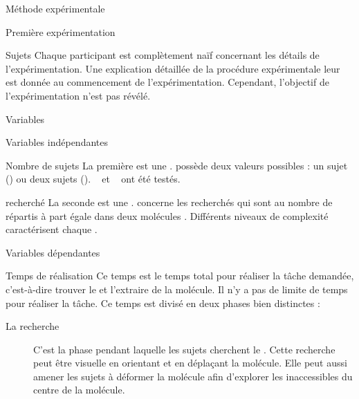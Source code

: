 \documentclass[myfrancais,ngerman,english,frenchb]{mythesis}
\begin{document}
\begin{mychapter}{Méthode expérimentale}
\begin{mysection}{Première expérimentation}
\begin{mysubsection}{Sujets}
				Chaque participant est complètement naïf concernant les détails de l'expérimentation.
				Une explication détaillée de la procédure expérimentale leur est donnée au commencement de l'expérimentation.
				Cependant, l'objectif de l'expérimentation n'est pas révélé.
			\end{mysubsection}
			\begin{mysubsection}{Variables}
				\begin{mysubsubsection}{Variables indépendantes}
					\begin{myparagraph}{ Nombre de sujets}
						La première  est une .
						 possède deux valeurs possibles : \og un sujet \fg (\mycf {}) ou \og deux sujets \fg (\mycf {}).
						~ et ~ ont été testés.
					\end{myparagraph}
					\begin{myparagraph}{  recherché}
						La seconde  est une .
						 concerne les  recherchés qui sont au nombre de  répartis à part égale dans deux molécules .
						Différents niveaux de complexité caractérisent chaque  .
					\end{myparagraph}
				\end{mysubsubsection}
				\begin{mysubsubsection}{Variables dépendantes}
					\begin{myparagraph}{ Temps de réalisation}
						Ce temps est le temps total pour réaliser la tâche demandée, c'est-à-dire trouver le  et l'extraire de la molécule.
						Il n'y a pas de limite de temps pour réaliser la tâche.
						Ce temps est divisé en deux phases bien distinctes :
						\begin{description}
							\item[La recherche] C'est la phase pendant laquelle les sujets cherchent le .
								Cette recherche peut être visuelle en orientant et en déplaçant la molécule.
								Elle peut aussi amener les sujets à déformer la molécule afin d'explorer les  inaccessibles du centre de la molécule.

\end{description}
\end{myparagraph}
\end{mysubsubsection}
\end{mysubsection}
\end{mysection}
\end{mychapter}
\end{document}
